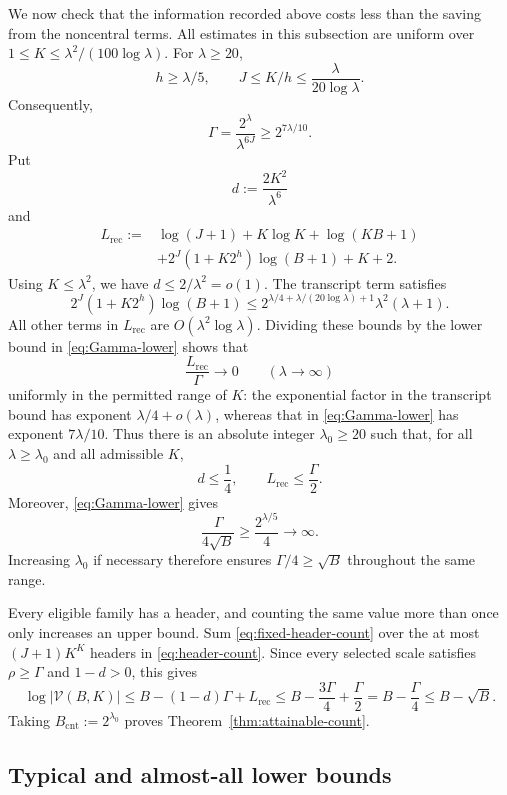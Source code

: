 \documentclass[11pt]{article}
\theoremstyle{definition}
\theoremstyle{remark}
\newcommand{\V}{\mathcal V}
\begin{document}
We now check that the information recorded above costs less than the saving
from the noncentral terms. All estimates in this subsection are uniform
over $1\le K\le \lambda^2/(100\log \lambda)$.
For $\lambda\ge20$,
\[
  h\ge \lambda/5,\qquad
  J\le K/h\le\frac{\lambda}{20\log \lambda}.
\]
Consequently,
\begin{equation}
  \Gamma=\frac{2^\lambda}{\lambda^{6J}}
     \ge2^{7\lambda/10}.
  \label{eq:Gamma-lower}
\end{equation}
Put
\[
  d:=\frac{2K^2}{\lambda^6}
\]
and
\begin{align*}
  L_{\mathrm{rec}}:={}&\log(J+1)+K\log K+\log(KB+1)\\
             &+2^J(1+K2^h)\log(B+1)+K+2.
\end{align*}
Using $K\le \lambda^2$, we have $d\le2/\lambda^2=o(1)$. The transcript term satisfies
\[
  2^J(1+K2^h)\log(B+1)
  \le2^{\lambda/4+\lambda/(20\log \lambda)+1}\lambda^2(\lambda+1).
\]
All other terms in $L_{\mathrm{rec}}$ are $O(\lambda^2\log \lambda)$. Dividing these bounds by
the lower bound in \eqref{eq:Gamma-lower} shows that
\[
  \frac{L_{\mathrm{rec}}}{\Gamma}\longrightarrow0
  \qquad(\lambda\longrightarrow\infty)
\]
uniformly in the permitted range of $K$: the exponential factor in the
transcript bound has exponent $\lambda/4+o(\lambda)$, whereas that in
\eqref{eq:Gamma-lower} has exponent $7\lambda/10$.
Thus there is an absolute integer $\lambda_0\ge20$ such that, for all $\lambda\ge \lambda_0$
and all admissible $K$,
\[
  d\le\frac14,\qquad L_{\mathrm{rec}}\le\frac\Gamma2.
\]
Moreover, \eqref{eq:Gamma-lower} gives
\[
  \frac{\Gamma}{4\sqrt B}
  \ge\frac{2^{\lambda/5}}4\longrightarrow\infty.
\]
Increasing $\lambda_0$ if necessary therefore ensures $\Gamma/4\ge\sqrt B$
throughout the same range.

Every eligible family has a header, and counting the same value more than
once only increases an upper bound. Sum \eqref{eq:fixed-header-count} over
the at most $(J+1)K^K$ headers in \eqref{eq:header-count}. Since every
selected scale satisfies $\rho\ge\Gamma$ and $1-d>0$, this gives
\[
  \log|\V(B,K)|
  \le B-(1-d)\Gamma+L_{\mathrm{rec}}
  \le B-\frac{3\Gamma}{4}+\frac\Gamma2
  =B-\frac\Gamma4
  \le B-\sqrt B.
\]
Taking $B_{\mathrm{cnt}}:=2^{\lambda_0}$ proves Theorem~\ref{thm:attainable-count}.



\subsection{Typical and almost-all lower bounds}
\end{document}
